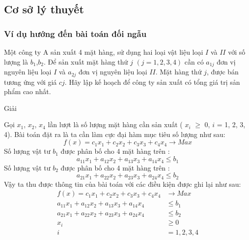 \documentclass{article}
\begin{document}
    \subsection{Cơ sở lý thuyết}
        \subsubsection{Ví dụ hướng đến bài toán đối ngẫu}
            Một công ty A sản xuất 4 mặt hàng, sử dụng hai loại vật liệu loại $I$ và $II$ với số lượng là $b_1$,$b_2$. Để sản xuất mặt hàng thứ $j$ \: $(j=1,2,3,4)$ cần có $a_{1j}$  đơn vị nguyên liệu loại $I$ và $a_{2j}$ đơn vị nguyên liệu loại $II$. Mặt hàng thứ $j$, được bán tương ứng với giá $cj$. Hãy lập kế hoạch để công ty sản xuất có tổng giá trị sản phẩm cao nhất.
            \begin{center}
                Giải
            \end{center}
            Gọi $x_1$, $x_2$, $x_4$ lần lượt là số lượng mặt hàng cần sản xuất ( $x_i$ $\geq$ 0, $i$ = 1, 2, 3, 4). Bài toán đặt ra là ta cần làm cực đại hàm mục tiêu số lượng như sau: \\
                \begin{equation}
                    f(x)=c_1x_1+c_2x_2+c_3x_3+c_4x_4 \rightarrow Max
                \end{equation}
            Số lượng vật tư $b_1$ được phân bố cho 4 mặt hàng trên : \\
                \begin{equation}
                    a_{11}x_1+a_{12}x_2+a_{13}x_3+a_{14}x_4 \leq b_1
                \end{equation}
            Số lượng vật tư $b_2$ được phân bố cho 4 mặt hàng trên :
                \begin{equation}
                    a_{21}x_1+a_{22}x_2+a_{23}x_3+a_{24}x_4 \leq b_2
                \end{equation}
            Vậy ta thu được thông tin của bài toán với các điều kiện được ghi lại như sau:
                \begin{equation}
                    \begin{split}
                    f(x)=c_1x_1+c_2x_2+c_3x_3+c_4x_4 &\rightarrow Max \\
                    a_{11}x_1+a_{12}x_2+a_{13}x_3+a_{14}x_4 &\leq b_1 \\
                    a_{21}x_1+a_{22}x_2+a_{23}x_3+a_{24}x_4 &\leq b_2 \\
                    x_i &\geq 0 \\
                    i &= 1, 2, 3, 4
                    \end{split}
                \end{equation}
\end{document}
